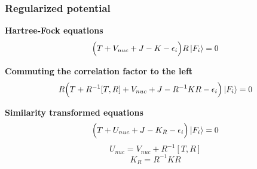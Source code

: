 \begin{frame}
\frametitle{Regularized potential}
\scriptsize
\centering

\textbf{Hartree-Fock equations}
\begin{equation}
    \nonumber
    \Big(T + V_{nuc} + J - K - \epsilon_i\Big)R\ket{F_i} = 0
\end{equation}

\vspace{5mm}

\pause
\textbf{Commuting the correlation factor to the left}
\begin{equation}
    \nonumber
    R\Big(T + R^{-1}[T,R] + V_{nuc} + J - R^{-1}KR - \epsilon_i\Big)\ket{F_i} = 0
\end{equation}

\vspace{5mm}

\pause
\textbf{Similarity transformed equations}
\begin{equation}
    \nonumber
    \Big(T + U_{nuc} + J - K_R - \epsilon_i\Big)\ket{F_i} = 0
\end{equation}
\begin{equation}
    \nonumber
    U_{nuc} = V_{nuc} + R^{-1}[T,R]
\end{equation}
\begin{equation}
    \nonumber
    K_R = R^{-1}KR
\end{equation}

\end{frame}


